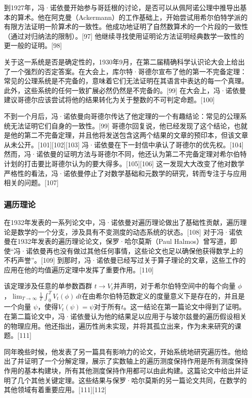 到1927年，冯·诺依曼开始参与哥廷根的讨论，是否可以从佩阿诺公理中推导出基本的算术。他在阿克曼（Ackermann）的工作基础上，开始尝试用希尔伯特学派的有限方法证明一阶算术的一致性。他成功地证明了自然数算术的一个片段的一致性（通过对归纳法的限制）。[97] 他继续寻找使用证明论方法证明经典数学一致性的更一般的证明。[98]

关于这一系统是否是确定性的，1930年9月，在第二届精确科学认识论大会上给出了一个强烈的否定答案。在大会上，库尔特·哥德尔宣布了他的第一不完备定理：常见的公理系统是不完备的，意味着它们无法证明在其语言中表达的每一个真理。此外，这些系统的任何一致扩展必然仍然是不完备的。[99] 在大会上，冯·诺依曼建议哥德尔应该尝试将他的结果转化为关于整数的不可判定命题。[100]

不到一个月后，冯·诺依曼向哥德尔传达了他定理的一个有趣结论：常见的公理系统无法证明它们自身的一致性。[99] 哥德尔回复说，他已经发现了这个结论，也就是他的第二不完备定理，并且他将发送包含这两个结果的文章的预印本，但该文章从未公开。[101][102][103] 冯·诺依曼在下一封信中承认了哥德尔的优先权。[104] 然而，冯·诺依曼的证明方法与哥德尔不同，他还认为第二不完备定理对希尔伯特计划的打击要比哥德尔认为的要大得多。[105][106] 这一发现大大改变了他对数学严格性的看法，冯·诺依曼停止了对数学基础和元数学的研究，转而专注于与应用相关的问题。[107]
\subsubsection{遍历理论}  
在1932年发表的一系列论文中，冯·诺依曼对遍历理论做出了基础性贡献，遍历理论是数学的一个分支，涉及具有不变测度的动态系统的状态。[108] 对于冯·诺依曼在1932年发表的遍历理论论文，保罗·哈尔莫斯（Paul Halmos）曾写道，即使“冯·诺依曼再也没有做过其他任何事情，这些论文也足以确保他获得数学上的不朽声誉”。[109] 到那时，冯·诺依曼已经写过关于算子理论的文章，这些工作的应用在他的均值遍历定理中发挥了重要作用。[110]

该定理涉及任意的单参数酉群 \(t \to V_{t}\)并声明，对于希尔伯特空间中的每个向量 \(\phi\)
，\(\lim_{T \to \infty} \frac{1}{T} \int_0^T V_{t}(\phi) \, dt\)在由希尔伯特范数定义的度量意义下是存在的，并且是一个向量 \(\psi\)，使得\(V_{t}(\psi) = \psi\)对于所有\(t\)。这一结论在第一篇论文中得到了证明。在第二篇论文中，冯·诺依曼认为他的结果足以应用于与玻尔兹曼的遍历假设相关的物理应用。他还指出，遍历性尚未实现，并将其孤立出来，作为未来研究的课题。[111]

同年晚些时候，他发表了另一篇具有影响力的论文，开始系统地研究遍历性。他给出了并证明了一个分解定理，展示了实数轴上的遍历测度保持作用是所有测度保持作用的基本构建块，所有其他测度保持作用都可以由此构建。这篇论文中给出并证明了几个其他关键定理。这些结果与保罗·哈尔莫斯的另一篇论文共同，在数学的其他领域有着重要应用。[111][112]
